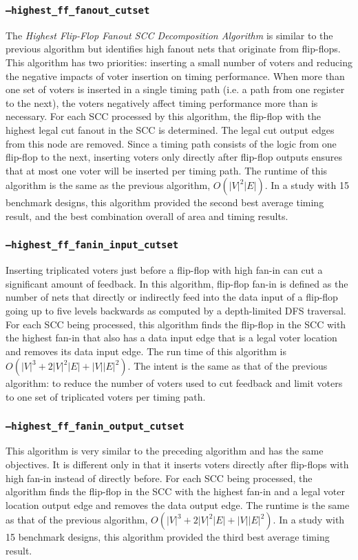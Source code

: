 \subsubsection{\texttt{--highest\_ff\_fanout\_cutset}}
The \emph{Highest Flip-Flop Fanout SCC Decomposition Algorithm} is
similar to the previous algorithm but identifies high fanout nets that
originate from flip-flops. This algorithm has two priorities:
inserting a small number of voters and reducing the negative impacts
of voter insertion on timing performance. When more than one set of
voters is inserted in a single timing path (i.e. a path from one
register to the next), the voters negatively affect timing performance
more than is necessary.  For each SCC processed by this algorithm, the
flip-flop with the highest legal cut fanout in the SCC is
determined. The legal cut output edges from this node are
removed. Since a timing path consists of the logic from one flip-flop
to the next, inserting voters only directly after flip-flop outputs
ensures that at most one voter will be inserted per timing path. The
runtime of this algorithm is the same as the previous algorithm,
$O(|V|^2|E|)$. In a study with 15 benchmark designs, this algorithm
provided the second best average timing result, and the best
combination overall of area and timing results.

\subsubsection{\texttt{--highest\_ff\_fanin\_input\_cutset}}
Inserting triplicated voters just before a flip-flop with high fan-in
can cut a significant amount of feedback.  In this algorithm,
flip-flop fan-in is defined as the number of nets that directly or
indirectly feed into the data input of a flip-flop going up to five
levels backwards as computed by a depth-limited DFS traversal.  For
each SCC being processed, this algorithm finds the flip-flop in the
SCC with the highest fan-in that also has a data input edge that is a
legal voter location and removes its data input edge. The run time of
this algorithm is $O(|V|^3 + 2|V|^2|E| + |V||E|^2)$. The intent is the
same as that of the previous algorithm: to reduce the number of voters
used to cut feedback and limit voters to one set of triplicated voters
per timing path.

\subsubsection{\texttt{--highest\_ff\_fanin\_output\_cutset}}
This algorithm is very similar to the preceding algorithm and has the
same objectives. It is different only in that it inserts voters
directly after flip-flops with high fan-in instead of directly
before. For each SCC being processed, the algorithm finds the
flip-flop in the SCC with the highest fan-in and a legal voter
location output edge and removes the data output edge. The runtime is
the same as that of the previous algorithm, $O(|V|^3 + 2|V|^2|E| +
|V||E|^2)$. In a study with 15 benchmark designs, this algorithm
provided the third best average timing result.




